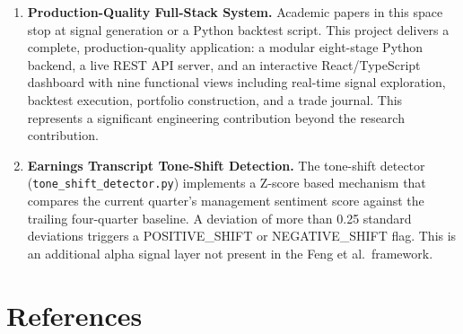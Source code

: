 \documentclass[12pt, a4paper]{article}
\begin{document}
\begin{enumerate}[leftmargin=2em, itemsep=6pt]
    \item \textbf{Production-Quality Full-Stack System.}
    Academic papers in this space stop at signal generation or a Python backtest script. This project delivers a complete, production-quality application: a modular eight-stage Python backend, a live REST API server, and an interactive React/TypeScript dashboard with nine functional views including real-time signal exploration, backtest execution, portfolio construction, and a trade journal. This represents a significant engineering contribution beyond the research contribution.

    \item \textbf{Earnings Transcript Tone-Shift Detection.}
    The tone-shift detector (\texttt{tone\_shift\_detector.py}) implements a Z-score based mechanism that compares the current quarter's management sentiment score against the trailing four-quarter baseline. A deviation of more than 0.25 standard deviations triggers a POSITIVE\_SHIFT or NEGATIVE\_SHIFT flag. This is an additional alpha signal layer not present in the Feng et al.\ framework.

\end{enumerate}

\section*{References}
\end{document}
